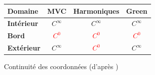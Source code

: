 \begin{figure}[h]
  \begin{center}
    \begin{tabular}{|l|c|c|c|}
      \hline
      Domaine & MVC & Harmoniques & Green\\
      \hline
      \textbf{Intérieur} & \textcolor{OliveGreen}{$C^\infty$} 
      & \textcolor{OliveGreen}{$C^\infty$} 
      & \textcolor{OliveGreen}{$C^\infty$} \\
      \hline
      \textbf{Bord} & \textcolor{Red}{$C^0$} 
      & \textcolor{Red}{$C^0$} 
      & \textcolor{Red}{$C^0$} \\
      \hline
      \textbf{Extérieur} & \textcolor{OliveGreen}{$C^\infty$} 
      & \textcolor{Red}{$C^0$}
      & \textcolor{OliveGreen}{$C^\infty$} \\
      \hline
    \end{tabular}
    \caption{Continuité des coordonnées (d'après \cite{GPCP13})}
    \label{SURcoo}
  \end{center}
\end{figure}



